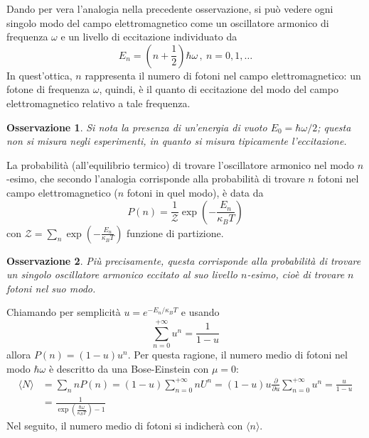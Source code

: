 \documentclass[11pt, a4paper]{scrartcl}
\theoremstyle{style}
\newtheorem{osservazione}{Osservazione}[section]
\numberwithin{equation}{subsection}
\begin{document}
\noindent Dando per vera l'analogia nella precedente osservazione, si pu\`o vedere ogni singolo modo del campo elettromagnetico come un oscillatore armonico di frequenza $ \omega$ e un livello di eccitazione individuato da 
\[
E_n = \left(n + \frac{1}{2}\right) \hbar \omega \, , \ n = 0,1 , \ldots
\] 
In quest'ottica, $n$ rappresenta il numero di fotoni nel campo elettromagnetico: un fotone di frequenza $\omega$, quindi, \`e il quanto di eccitazione del modo del campo elettromagnetico relativo a tale frequenza.
\begin{osservazione}
Si nota la presenza di un'energia di vuoto $E_0 = \hbar \omega / 2$; questa non si misura negli esperimenti, in quanto si misura tipicamente l'eccitazione.
\end{osservazione}
\noindent La probabilit\`a (all'equilibrio termico) di trovare l'oscillatore armonico nel modo $n$-esimo, che secondo l'analogia corrisponde alla probabilit\`a di trovare $n$ fotoni nel campo elettromagnetico ($n$ fotoni in quel modo), \`e data da
\begin{equation}
	P(n) = \frac{1}{\mathcal{Z} } \exp \left(- \frac{E_n}{\kappa _B T}\right) 
\end{equation}
con $\mathcal{Z} = \sum_{n}^{} \exp\left(- \frac{E_n}{\kappa _B T}\right) $ funzione di partizione.
\begin{osservazione}
Pi\`u precisamente, questa corrisponde alla probabilit\`a di trovare un singolo oscillatore armonico eccitato al suo livello $n$-esimo, cio\`e di trovare $n$ fotoni nel suo modo.
\end{osservazione}
\noindent Chiamando per semplicit\`a $u = e^{- E_n / \kappa _B T}$ e usando 
\[
\sum_{n=0}^{+\infty} u ^ n = \frac{1}{1 - u}
\] 
allora $P(n) = (1-u) u ^n$.
Per questa ragione, il numero medio di fotoni nel modo $\hbar \omega$ \`e descritto da una Bose-Einstein con $\mu  =0 $:
\begin{equation}
	\begin{split}
		\langle N \rangle &= \sum_{n}^{} n P(n) = (1-u ) \sum_{n=0}^{+\infty} n U^n = (1-u) u \frac{\partial }{\partial u} \sum_{n=0}^{+\infty} u^n = \frac{u}{1-u}\\
				  & = \frac{1}{\exp \left(\frac{\hbar \omega}{\kappa _B T}\right) - 1}
	\end{split}
\end{equation}
Nel seguito, il numero medio di fotoni si indicher\`a con $\langle n \rangle$.
\end{document}
